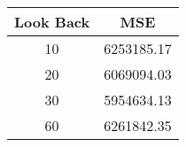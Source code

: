\begin{tabular}{cc}
    \toprule
    Look Back & MSE \\
    \midrule
    10 & 6253185.17 \\
    20 & 6069094.03 \\
    30 & 5954634.13 \\
    60 & 6261842.35 \\
    \bottomrule
\end{tabular}
